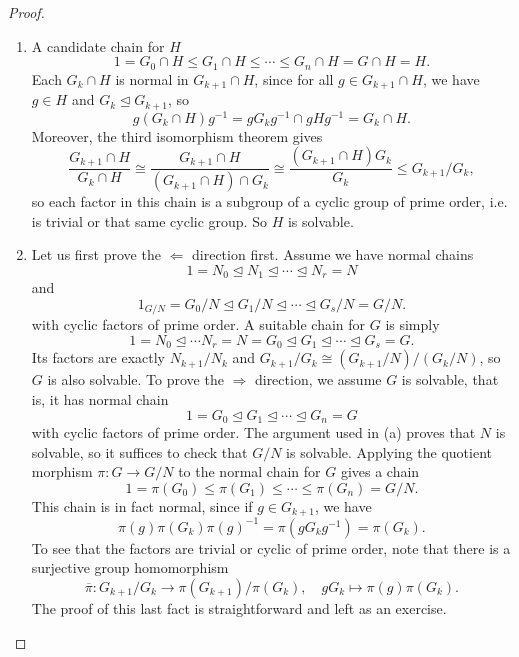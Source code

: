 \begin{proof} ~
    \begin{enumerate}[label=(\alph*)]
        \item A candidate chain for $H$
        \[
            1 = G_0 \cap H \leq G_1 \cap H \leq \cdots \leq G_n \cap H = G \cap H = H.
        \]
        Each $G_k \cap H$ is normal in $G_{k + 1} \cap H$, since for all $g \in G_{k + 1} \cap H$, we have $g \in H$ and $G_k \unlhd G_{k + 1}$, so
        \[
            g(G_k \cap H)g^{-1} = gG_kg^{-1} \cap gHg^{-1} = G_k \cap H.
        \]
        Moreover, the third isomorphism theorem gives
        \[
            \frac{G_{k + 1} \cap H}{G_k \cap H} \cong \frac{G_{k + 1} \cap H}{(G_{k + 1} \cap H) \cap G_k} \cong \frac{(G_{k + 1} \cap H) G_k}{G_k} \leq G_{k + 1}/G_k,
        \]
        so each factor in this chain is a subgroup of a cyclic group of prime order, i.e. is trivial or that same cyclic group. So $H$ is solvable.
        
        \item Let us first prove the $\Leftarrow$ direction first. Assume we have normal chains
        \[
            1 = N_0 \unlhd N_1 \unlhd \cdots \unlhd N_r = N
        \]
        and
        \[
            1_{G/N} = G_0/N \unlhd G_1/N \unlhd \cdots \unlhd G_s/N = G/N.
        \]
        with cyclic factors of prime order. A suitable chain for $G$ is simply
        \[
            1 = N_0 \unlhd \cdots N_r = N = G_0 \unlhd G_1 \unlhd \cdots \unlhd G_s = G.
        \]
        Its factors are exactly $N_{k + 1}/N_k$ and $G_{k + 1}/G_k \cong (G_{k + 1}/N)/(G_{k}/N)$, so $G$ is also solvable. To prove the $\Rightarrow$ direction, we assume $G$ is solvable, that is, it has normal chain
        \[
            1 = G_0 \unlhd G_1 \unlhd \cdots \unlhd G_n = G
        \]
        with cyclic factors of prime order. The argument used in (a) proves that $N$ is solvable, so it suffices to check that $G/N$ is solvable. Applying the quotient morphism $\pi: G \to G/N$ to the normal chain for $G$ gives a chain
        \[
            1 = \pi(G_0) \leq \pi(G_1) \leq \cdots \leq \pi(G_n) = G/N.
        \]
        This chain is in fact normal, since if $g \in G_{k + 1}$, we have
        \[
            \pi(g) \pi(G_k) \pi(g)^{-1} = \pi(gG_kg^{-1}) = \pi(G_k).
        \]
        To see that the factors are trivial or cyclic of prime order, note that there is a surjective group homomorphism
        \[
            \overline{\pi}: G_{k + 1}/G_k \to \pi(G_{k + 1})/\pi(G_k), \quad gG_{k} \longmapsto \pi(g)\pi(G_k).
        \]
        The proof of this last fact is straightforward and left as an exercise. \qedhere
    \end{enumerate}
\end{proof}


